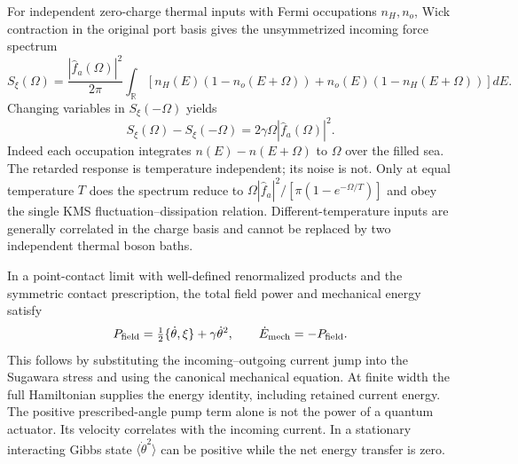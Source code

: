For independent zero-charge thermal inputs with Fermi occupations
$n_H,n_o$, Wick contraction in the original port basis gives the
unsymmetrized incoming force spectrum
\begin{equation}\label{eq:inertial-noise}
 S_\xi(\Omega)=\frac{|\widehat f_a(\Omega)|^2}{2\pi}
 \int_{\mathbb R}\left[n_H(E)(1-n_o(E+\Omega))
                  +n_o(E)(1-n_H(E+\Omega))\right]dE.
\end{equation}
Changing variables in $S_\xi(-\Omega)$ yields
\begin{equation}\label{eq:inertial-noise-commutator}
 S_\xi(\Omega)-S_\xi(-\Omega)
       =2\gamma\Omega|\widehat f_a(\Omega)|^2.
\end{equation}
Indeed each occupation integrates
$n(E)-n(E+\Omega)$ to $\Omega$ over the filled sea.
The retarded response is temperature independent; its noise is not.
Only at equal temperature $T$ does the spectrum reduce to
$\Omega|\widehat f_a|^2/[\pi(1-e^{-\Omega/T})]$ and obey the single
KMS fluctuation--dissipation relation. Different-temperature inputs
are generally correlated in the charge basis and cannot be replaced
by two independent thermal boson baths.

In a point-contact limit with well-defined renormalized products and
the symmetric contact prescription, the total field power and
mechanical energy satisfy
\begin{equation}\label{eq:inertial-power}
 P_{\rm field}=\tfrac12\{\dot\theta,\xi\}+\gamma\dot\theta^2,
 \qquad \dot E_{\rm mech}=-P_{\rm field}.
\end{equation}
This follows by substituting the incoming--outgoing current jump into
the Sugawara stress and using the canonical mechanical equation.
At finite width the full Hamiltonian supplies the energy identity,
including retained current energy. The positive prescribed-angle pump
term alone is not the power of a quantum actuator. Its velocity
correlates with the incoming current. In a stationary interacting
Gibbs state $\langle\dot\theta^2\rangle$ can be positive while the
net energy transfer is zero.

